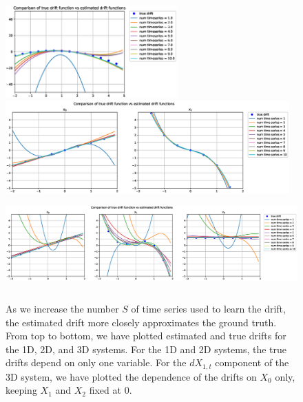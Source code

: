 \documentclass{article}
\begin{document}
\begin{figure}[th]
\begin{center}
\includegraphics[height=1.4in]{../1dcode/varying_num_timeseries/plots/drift_comparison.eps}\\
\includegraphics[height=1.4in]{../2dcode/varying_num_timeseries/plots/drift_comparison.eps}\\
\includegraphics[height=1.4in]{../3ddampedduffing/varying_num_timeseries/plots/drift_comparison.eps}
\end{center}
\caption{As we increase the number $S$ of time series used to learn the drift,
the estimated drift more closely approximates the ground truth.  From top to bottom, we have plotted estimated and true drifts for the 1D, 2D, and 3D systems.  For the 1D and 2D systems, the true drifts depend on only one variable.  For the $dX_{1,t}$ component of the 3D system, we have plotted the dependence of the drifts on $X_0$ only, keeping $X_1$ and $X_2$ fixed at $0$.}
\label{fig:exp1drift}
\end{figure}
\end{document}
